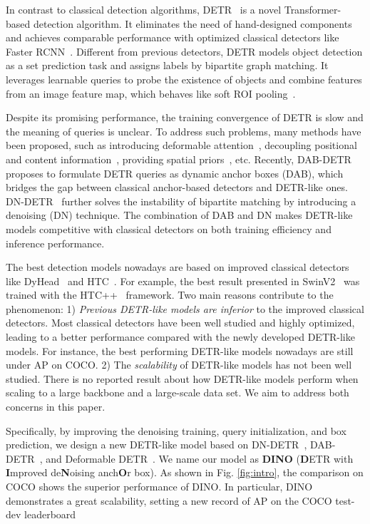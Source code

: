 \documentclass[runningheads]{llncs}
\newcommand{\modelname}{{DINO}}
\begin{document}
In contrast to classical detection algorithms, DETR~\cite{carion2020end} is a novel Transformer-based detection algorithm. It eliminates the need of hand-designed components and achieves comparable performance with optimized classical detectors like Faster RCNN~\cite{RenHG017}. Different from previous detectors, DETR models object detection as a set prediction task and assigns labels by bipartite graph matching. It leverages learnable queries to probe the existence of objects and combine features from an image feature map, which behaves like soft ROI pooling~\cite{liu2022dab}.

Despite its promising performance, the training convergence of DETR is slow and the meaning of queries is unclear. To address such problems, many methods have been proposed, such as introducing deformable attention~\cite{zhu2020deformable}, decoupling positional and content information~\cite{meng2021conditional}, providing spatial priors~\cite{gao2021fast,yao2021efficient,wang2021anchor}, etc. Recently, DAB-DETR~\cite{liu2022dab} proposes to formulate DETR queries as dynamic anchor boxes (DAB), which bridges the gap between classical anchor-based detectors and DETR-like ones. DN-DETR~\cite{li2022dn} further solves the instability of bipartite matching by introducing a denoising (DN) technique. The combination of DAB and DN makes DETR-like models competitive with classical detectors on both training efficiency and inference performance.


The best detection models nowadays are based on improved classical detectors like DyHead~\cite{Dai_2021_ICCV} and HTC~\cite{chen2019hybrid}. For example, the best result presented in SwinV2~\cite{liu2021swinv2} was trained with the HTC++~\cite{chen2019hybrid,liu2021swin} framework. 
Two main reasons contribute to the phenomenon: 1) 
\textit{Previous DETR-like models are inferior} to the improved classical detectors. Most classical detectors have been well studied and highly optimized, leading to a better performance compared with the newly developed DETR-like models. For instance, the best performing DETR-like models nowadays are still under  AP on COCO.  
2) The \textit{scalability} of DETR-like models has not been well studied. There is no reported result about how DETR-like models perform when scaling to a large backbone and a large-scale data set. We aim to address both concerns in this paper.


Specifically, by improving the denoising training, query initialization, and box prediction, we 
design a new DETR-like model based on DN-DETR~\cite{li2022dn},  DAB-DETR~\cite{liu2022dab}, and Deformable DETR~\cite{zhu2020deformable}. 
We name our model as \textbf{\modelname} (\textbf{D}ETR with \textbf{I}mproved de\textbf{N}oising anch\textbf{O}r box).
As shown in Fig. \ref{fig:intro}, the comparison on COCO shows the superior performance of {\modelname}.
In particular, {\modelname} demonstrates a great scalability, setting a new record of  AP on the COCO test-dev leaderboard \cite{paperwithcode}
\end{document}
